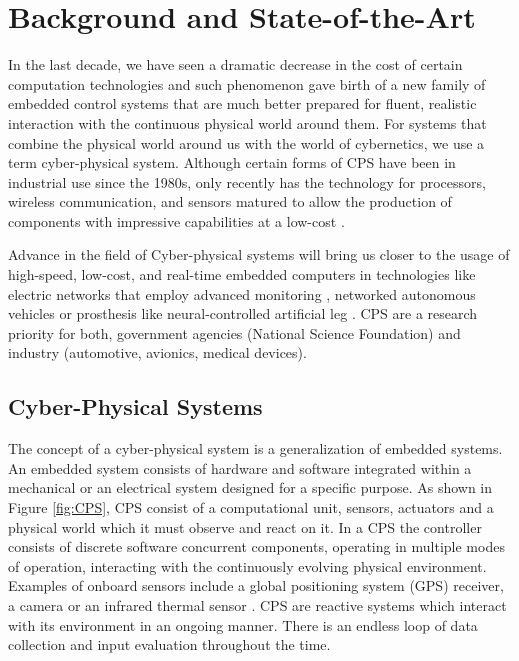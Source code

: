 \chapter{Background and State-of-the-Art}
\label{chap.stateoftheart}

In the last decade, we have seen a dramatic decrease in the cost of certain computation technologies and such phenomenon gave birth of a new family of embedded control systems that are much better prepared for fluent, realistic interaction with the continuous physical world around them. For systems that combine the physical world around us with the world of cybernetics, we use a term cyber-physical system. Although certain forms of CPS have been in industrial use since the 1980s, only recently has the technology for processors, wireless communication, and sensors matured to allow the production of components with impressive capabilities at a low-cost \cite{Rajeev:PrinciplesCPS}.

Advance in the field of Cyber-physical systems will bring us closer to the usage of high-speed, low-cost, and real-time embedded computers in technologies like electric networks that employ advanced monitoring \cite{Xue:SmartGrids}, networked autonomous vehicles \cite{Lee:DesignCPS} or prosthesis like neural-controlled artificial leg \cite{Zhang:ArtificialLegs}. CPS are a research priority for both, government agencies (National Science Foundation) and industry (automotive, avionics, medical devices).

\section{Cyber-Physical Systems}

The concept of a cyber-physical system is a generalization of embedded systems. An embedded system consists of hardware and software integrated within a mechanical or an electrical system designed for a specific purpose. As shown in Figure \ref{fig:CPS}, CPS consist of a computational unit, sensors, actuators and a physical world which it must observe and react on it. In a CPS the controller consists of discrete software concurrent components, operating in multiple modes of operation, interacting with the continuously evolving physical environment. Examples of onboard sensors include a global positioning system (GPS) receiver, a camera or an infrared thermal sensor \cite{Rajeev:PrinciplesCPS}. CPS are reactive systems which interact with its environment in an ongoing manner. There is an endless loop of data collection and input evaluation throughout the time.

